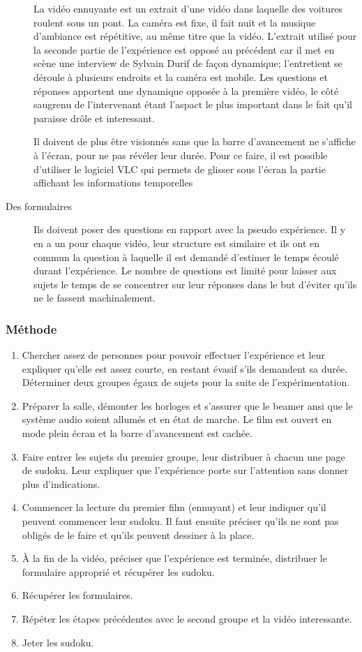 \documentclass[12pt,fleqn,oneside,openany]{book} %
\begin{document}
\begin{description}
	La vidéo ennuyante est un extrait d'une vidéo dans laquelle des voitures roulent sous un pont. La caméra est fixe, il fait nuit et la musique d'ambiance est répétitive, au même titre que la vidéo. L'extrait utilisé pour la seconde partie de l'expérience est opposé au précédent car il met en scène une interview de Sylvain Durif de façon dynamique; l'entretient se déroule à plusieurs endroits et la caméra est mobile. Les questions et réponses apportent une dynamique opposée à la première vidéo, le côté saugrenu de l'intervenant étant l'aspact le plus important dans le fait qu'il paraisse drôle et interessant. 

	Il doivent de plus être visionnés sans que la barre d'avancement ne s'affiche à l'écran, pour ne pas révéler leur durée. Pour ce faire, il est possible d'utiliser le logiciel VLC qui permets de glisser sous l'écran la partie affichant les informations temporelles
	\item[Des formulaires] Ils doivent poser des questions en rapport avec la pseudo expérience. Il y en a un pour chaque vidéo, leur structure est similaire et ils ont en commun la question à laquelle il est demandé d'estimer le temps écoulé durant l'expérience. Le nombre de questions est limité pour laisser aux sujets le temps de se concentrer sur leur réponses dans le but d'éviter qu'ils ne le fassent machinalement.
\end{description}

\subsubsection{Méthode} \label{sssec:methode1}
\begin{enumerate}
	\item Chercher assez de personnes pour pouvoir effectuer l'expérience et leur expliquer qu'elle est assez courte, en restant évasif s'ils demandent sa durée. Déterminer deux groupes égaux de sujets pour la suite de l'expérimentation.
	\item Préparer la salle, démonter les horloges et s'assurer que le beamer ansi que le système audio soient allumés et en état de marche. Le film est ouvert en mode plein écran et la barre d'avancement est cachée.
	\item Faire entrer les sujets du premier groupe, leur distribuer à chacun une page de sudoku. Leur expliquer que l'expérience porte sur l'attention sans donner plus d'indications. 
	\item Commencer la lecture du premier film (ennuyant) et leur indiquer qu'il peuvent commencer leur sudoku. Il faut ensuite préciser qu'ils ne sont pas obligés de le faire et qu'ils peuvent dessiner à la place. 
	\item À la fin de la vidéo, préciser que l'expérience est terminée, distribuer le formulaire approprié et récupérer les sudoku.
	\item Récupérer les formulaires.
	\item Répéter les étapes précédentes avec le second groupe et la vidéo interessante.
	\item Jeter les sudoku.
\end{enumerate}
\end{document}
